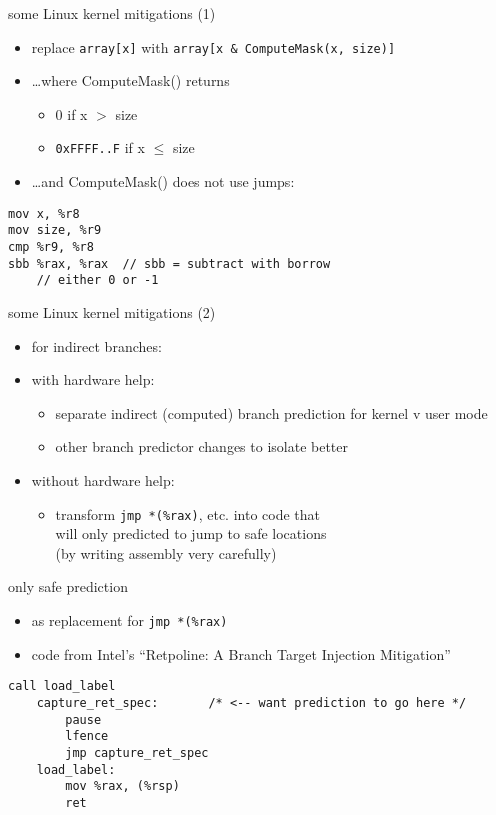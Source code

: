 \begin{frame}[fragile]{some Linux kernel mitigations (1)}
\begin{itemize}
\item replace \lstinline|array[x]| with \lstinline|array[x & ComputeMask(x, size)]|
\item \ldots where ComputeMask() returns
    \begin{itemize}
    \item 0 if x $>$ size
    \item \texttt{0xFFFF..F} if x $\le$ size
    \end{itemize}
\item \ldots and ComputeMask() does not use jumps:
\end{itemize}
\begin{lstlisting}[style=small,language=myasm]
mov x, %r8
mov size, %r9
cmp %r9, %r8
sbb %rax, %rax  // sbb = subtract with borrow
    // either 0 or -1
\end{lstlisting}
\end{frame}

\begin{frame}[fragile]{some Linux kernel mitigations (2)}
\begin{itemize}
\item for indirect branches:
\vspace{.5cm}
\item with hardware help:
    \begin{itemize}
    \item separate indirect (computed) branch prediction for kernel v user mode
    \item other branch predictor changes to isolate better
    \end{itemize}
\item without hardware help:
    \begin{itemize}
    \item transform \lstinline|jmp *(%rax)|, etc. into code that \\
        will only predicted to jump to safe locations \\
        (by writing assembly very carefully)
    \end{itemize}
\end{itemize}
\end{frame}

\begin{frame}[fragile]{only safe prediction}
\begin{itemize}
\item as replacement for \lstinline|jmp *(%rax)|
\item code from Intel's ``Retpoline: A Branch Target Injection Mitigation''
\end{itemize}
\begin{lstlisting}[language=myasm,style=small]
        call load_label
    capture_ret_spec:       /* <-- want prediction to go here */
        pause
        lfence
        jmp capture_ret_spec
    load_label:
        mov %rax, (%rsp)
        ret
\end{lstlisting}
\end{frame}
